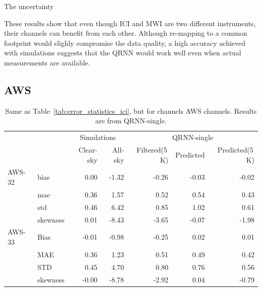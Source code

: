 \documentclass[amt, manuscript]{copernicus}
\begin{document}
The uncertainty 

These results show that even though ICI and MWI are two different instruments, their channels can benefit from each other. Although re-mapping to a common footprint would slighly compromise the data quality, a high accuracy achieved with simulations suggests that the QRNN would work well even when actual measurements are available.

\subsection{AWS}
%
\begin{table}[t]
	\caption{Same as Table~\ref{tab:error_statistics_ici}, but for channels AWS channels. Results are from QRNN-single. }
	\label{tab:statistics_qrnn_aws}
	\begin{tabular}{llrr|rrr}
		\tophline
		&&\multicolumn{2}{c|}{Simulations}& \multicolumn{3}{c}{QRNN-single} \\
		\cline{3-7}
		&&   Clear-sky &   All-sky &  Filtered(5\,K) & Predicted & Predicted(5\,K) \\
		\middlehline
		AWS-32  &bias     & 0.00 & -1.32 & -0.26 & -0.03 & -0.02 \\
				&mae      & 0.36 &  1.57 &  0.52 &  0.54 &  0.43 \\
				&std      & 0.46 &  6.42 &  0.85 &  1.02 &  0.61 \\
				&skewness & 0.01 & -8.43 & -3.65 & -0.07 & -1.98 \\
		\middlehline
		AWS-33	&Bias     & -0.01 & -0.98 & -0.25 & 0.02 &  0.01 \\
				&MAE      &  0.36 &  1.23 &  0.51 & 0.49 &  0.42 \\
				&STD      &  0.45 &  4.70 &  0.80 & 0.76 &  0.56 \\
				&skewness & -0.00 & -8.78 & -2.92 & 0.04 & -0.79 \\
		

\end{tabular}
\end{table}
\end{document}
